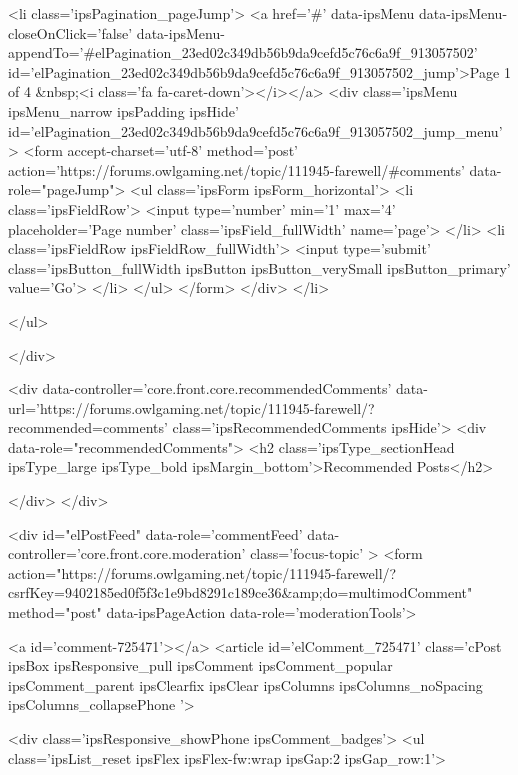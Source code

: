 			
				<li class='ipsPagination_pageJump'>
					<a href='#' data-ipsMenu data-ipsMenu-closeOnClick='false' data-ipsMenu-appendTo='#elPagination_23ed02c349db56b9da9cefd5c76c6a9f_913057502' id='elPagination_23ed02c349db56b9da9cefd5c76c6a9f_913057502_jump'>Page 1 of 4 &nbsp;<i class='fa fa-caret-down'></i></a>
					<div class='ipsMenu ipsMenu_narrow ipsPadding ipsHide' id='elPagination_23ed02c349db56b9da9cefd5c76c6a9f_913057502_jump_menu'>
						<form accept-charset='utf-8' method='post' action='https://forums.owlgaming.net/topic/111945-farewell/#comments' data-role="pageJump">
							<ul class='ipsForm ipsForm_horizontal'>
								<li class='ipsFieldRow'>
									<input type='number' min='1' max='4' placeholder='Page number' class='ipsField_fullWidth' name='page'>
								</li>
								<li class='ipsFieldRow ipsFieldRow_fullWidth'>
									<input type='submit' class='ipsButton_fullWidth ipsButton ipsButton_verySmall ipsButton_primary' value='Go'>
								</li>
							</ul>
						</form>
					</div>
				</li>
			
		
	</ul>

					
				</div>
			
	

	

<div data-controller='core.front.core.recommendedComments' data-url='https://forums.owlgaming.net/topic/111945-farewell/?recommended=comments' class='ipsRecommendedComments ipsHide'>
	<div data-role="recommendedComments">
		<h2 class='ipsType_sectionHead ipsType_large ipsType_bold ipsMargin_bottom'>Recommended Posts</h2>
		
	</div>
</div>
	
	<div id="elPostFeed" data-role='commentFeed' data-controller='core.front.core.moderation' class='focus-topic' >
		<form action="https://forums.owlgaming.net/topic/111945-farewell/?csrfKey=9402185ed0f5f3c1e9bd8291c189ce36&amp;do=multimodComment" method="post" data-ipsPageAction data-role='moderationTools'>
			
			
				
					
					
					



<a id='comment-725471'></a>
<article  id='elComment_725471' class='cPost ipsBox ipsResponsive_pull  ipsComment ipsComment_popular ipsComment_parent ipsClearfix ipsClear ipsColumns ipsColumns_noSpacing ipsColumns_collapsePhone    '>
	

	
		<div class='ipsResponsive_showPhone ipsComment_badges'>
			<ul class='ipsList_reset ipsFlex ipsFlex-fw:wrap ipsGap:2 ipsGap_row:1'>
				
